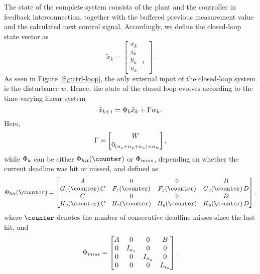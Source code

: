 The state of the complete system consists of the plant and the controller in feedback interconnection, together with the buffered previous measurement value and the calculated next control signal.
Accordingly, we define the closed-loop state vector as
\begin{equation*}
    \tilde{x}_k = \begin{bmatrix} x_k \\ z_k \\ y_{k-1} \\ u_k \end{bmatrix} .
\end{equation*}
As seen in Figure~\ref{fig:ctrl-loop}, the only external input of the closed-loop system is the disturbance $w$.
Hence, the state of the closed loop evolves according to the time-varying linear system
\begin{equation}
    \label{eq:cl-system}
    \tilde{x}_{k+1} = \clmat{}_{k} \tilde{x}_k + \clinp{} w_k.
\end{equation}
Here,
\begin{equation*}
    \Gamma{} = \begin{bmatrix} W \\ 0_{(n_z+n_y+n_u) \times n_w} \end{bmatrix},
\end{equation*}
while $\Phi{}_k$ can be either $\clmat{}_{hit}(\counter)$ or $\Phi{}_{miss}$, depending on whether the current deadline was hit or missed, and defined as
\begin{equation*}
    \clmat{}_{hit}(\counter) = \begin{bmatrix} \Ap & 0 & 0 & \Bp \\
        \Bc_y(\counter) \, \Cp & \Ac_z(\counter) & \Ac_y(\counter) & \Bc_y(\counter) \, \Dp \\
        \Cp & 0 & 0 & \Dp \\
        \Dc_y(\counter) \, \Cp & \Cc_z(\counter) & \Cc_y(\counter) & \Dc_y(\counter) \, \Dp
    \end{bmatrix},
\end{equation*}
where $\counter$ denotes the number of consecutive deadline misses since the last hit, and
\begin{equation*}
    \Phi{}_{miss} = \begin{bmatrix} A & 0 & 0 & B \\
        0 & I_{n_z} & 0 & 0 \\
        0 & 0 & I_{n_y} & 0 \\
    0 & 0 & 0 & I_{n_u} \end{bmatrix}.
\end{equation*}

